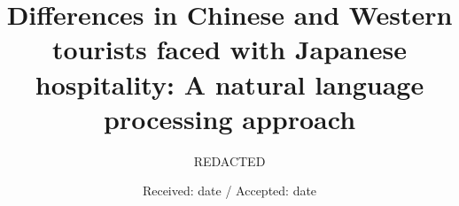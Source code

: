 \documentclass[smallextended,natbib]{svjour3}       %
\begin{document}
\title{Differences in Chinese and Western tourists faced with Japanese hospitality: A natural language processing approach}


        \author{REDACTED}



        \date{Received: date / Accepted: date}

        \maketitle
\end{document}

